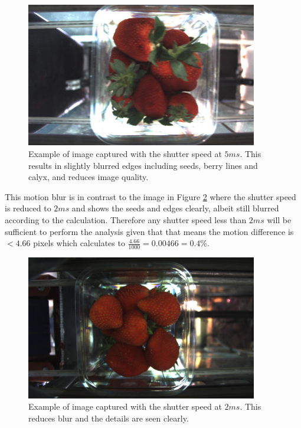 \documentclass[fleqn,twoside,12pt]{report}
\begin{document}
\begin{figure}[h]
	\centering
	\includegraphics[width=0.9\textwidth]{blur_1.jpg}
	\caption{Example of image captured with the shutter speed at $5ms$. This results in slightly blurred edges including seeds, berry lines and calyx, and reduces image quality.}
	\label{fig:blur_1}
\end{figure}

This motion blur is in contrast to the image in Figure \ref{fig:sharp_1} where the shutter speed is reduced to $2ms$ and shows the seeds and edges clearly, albeit still blurred according to the calculation. Therefore any shutter speed less than $2ms$ will be sufficient to perform the analysis given that that means the motion difference is $<4.66$ pixels which calculates to $\frac{4.66}{1000} = 0.00466 = 0.4\%$.

\begin{figure}[h]
	\centering
	\includegraphics[width=0.9\textwidth]{sharp_1.jpg}
	\caption{Example of image captured with the shutter speed at $2ms$. This reduces blur and the details are seen clearly.}
	\label{fig:sharp_1}
\end{figure}
\end{document}
